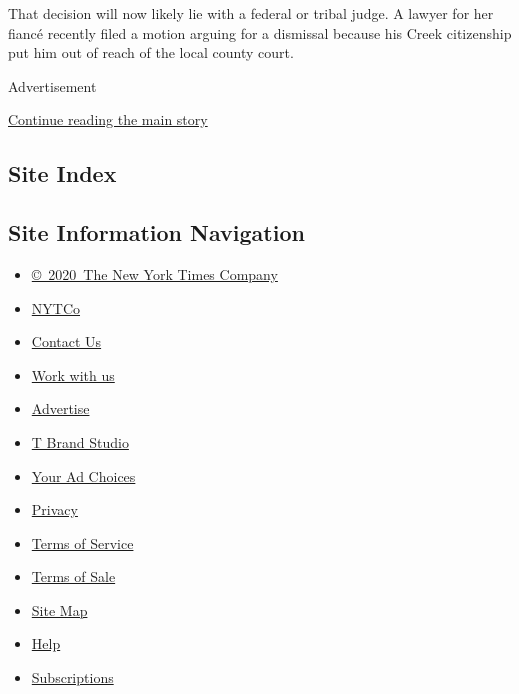 That decision will now likely lie with a federal or tribal judge. A
lawyer for her fiancé recently filed a motion arguing for a dismissal
because his Creek citizenship put him out of reach of the local county
court.

Advertisement

\protect\hyperlink{after-bottom}{Continue reading the main story}

\hypertarget{site-index}{%
\subsection{Site Index}\label{site-index}}

\hypertarget{site-information-navigation}{%
\subsection{Site Information
Navigation}\label{site-information-navigation}}

\begin{itemize}
\tightlist
\item
  \href{https://help.nytimes3xbfgragh.onion/hc/en-us/articles/115014792127-Copyright-notice}{©~2020~The
  New York Times Company}
\end{itemize}

\begin{itemize}
\tightlist
\item
  \href{https://www.nytco.com/}{NYTCo}
\item
  \href{https://help.nytimes3xbfgragh.onion/hc/en-us/articles/115015385887-Contact-Us}{Contact
  Us}
\item
  \href{https://www.nytco.com/careers/}{Work with us}
\item
  \href{https://nytmediakit.com/}{Advertise}
\item
  \href{http://www.tbrandstudio.com/}{T Brand Studio}
\item
  \href{https://www.nytimes3xbfgragh.onion/privacy/cookie-policy\#how-do-i-manage-trackers}{Your
  Ad Choices}
\item
  \href{https://www.nytimes3xbfgragh.onion/privacy}{Privacy}
\item
  \href{https://help.nytimes3xbfgragh.onion/hc/en-us/articles/115014893428-Terms-of-service}{Terms
  of Service}
\item
  \href{https://help.nytimes3xbfgragh.onion/hc/en-us/articles/115014893968-Terms-of-sale}{Terms
  of Sale}
\item
  \href{https://spiderbites.nytimes3xbfgragh.onion}{Site Map}
\item
  \href{https://help.nytimes3xbfgragh.onion/hc/en-us}{Help}
\item
  \href{https://www.nytimes3xbfgragh.onion/subscription?campaignId=37WXW}{Subscriptions}
\end{itemize}
